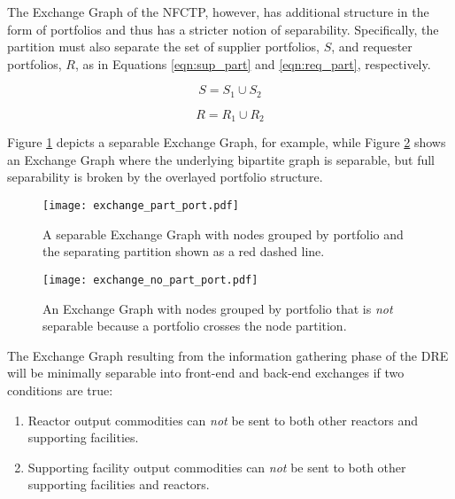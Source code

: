 The Exchange Graph of the NFCTP, however, has additional structure in the form
of portfolios and thus has a stricter notion of separability. Specifically, the
partition must also separate the set of supplier portfolios, $S$, and requester
portfolios, $R$, as in Equations \ref{eqn:sup_part} and \ref{eqn:req_part},
respectively.

\begin{equation}\label{eqn:sup_part}
  S = S_{1} \cup S_{2}
\end{equation}

\begin{equation}\label{eqn:req_part}
  R = R_{1} \cup R_{2}
\end{equation}

Figure \ref{fig:port_part} depicts a separable Exchange Graph, for example,
while Figure \ref{fig:port_no_part} shows an Exchange Graph where the underlying
bipartite graph is separable, but full separability is broken by the overlayed
portfolio structure.

\begin{figure}
  \begin{center}
    \texttt{[image: exchange\_part\_port.pdf]}
    \caption[]{
      \label{fig:port_part}
      A separable Exchange Graph with nodes grouped by portfolio and the
      separating partition shown as a red dashed line.}
  \end{center}
\end{figure}

\begin{figure}
  \begin{center}
    \texttt{[image: exchange\_no\_part\_port.pdf]}
    \caption[]{
      \label{fig:port_no_part}
      An Exchange Graph with nodes grouped by portfolio that is \textit{not}
      separable because a portfolio crosses the node partition.}
  \end{center}
\end{figure}

The Exchange Graph resulting from the information gathering phase of the DRE
will be minimally separable into front-end and back-end exchanges if two
conditions are true:

\begin{enumerate}
  \item Reactor output commodities can \textit{not} be sent to both other
    reactors and supporting facilities.

  \item Supporting facility output commodities can \textit{not} be sent to both
    other supporting facilities and reactors.
\end{enumerate}


